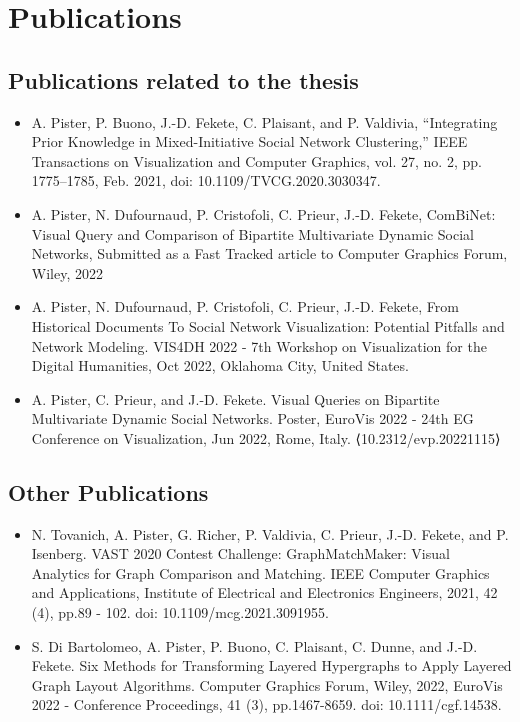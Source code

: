 \chapter*{Publications}


\section*{Publications related to the thesis}

\begin{itemize}
    \item A. Pister, P. Buono, J.-D. Fekete, C. Plaisant, and P. Valdivia, “Integrating Prior Knowledge in Mixed-Initiative Social Network Clustering,” IEEE Transactions on Visualization and Computer Graphics, vol. 27, no. 2, pp. 1775–1785, Feb. 2021, doi: 10.1109/TVCG.2020.3030347.
    \item A. Pister, N. Dufournaud, P. Cristofoli, C. Prieur, J.-D. Fekete, ComBiNet: Visual Query and Comparison of Bipartite Multivariate Dynamic Social Networks, Submitted as a Fast Tracked article to Computer Graphics Forum, Wiley, 2022
    \item A. Pister, N. Dufournaud, P. Cristofoli, C. Prieur, J.-D. Fekete, From Historical Documents To Social Network Visualization: Potential Pitfalls and Network Modeling. VIS4DH 2022 - 7th Workshop on Visualization for the Digital Humanities, Oct 2022, Oklahoma City, United States.
    \item  A. Pister, C. Prieur, and J.-D. Fekete. Visual Queries on Bipartite Multivariate Dynamic Social Networks. Poster, EuroVis 2022 - 24th EG Conference on Visualization, Jun 2022, Rome, Italy. ⟨10.2312/evp.20221115⟩
\end{itemize}


\section*{Other Publications}

\begin{itemize}
    \item N. Tovanich, A. Pister, G. Richer, P. Valdivia, C. Prieur, J.-D. Fekete, and P. Isenberg. VAST 2020 Contest Challenge: GraphMatchMaker: Visual Analytics for Graph Comparison and Matching. IEEE Computer Graphics and Applications, Institute of Electrical and Electronics Engineers, 2021, 42 (4), pp.89 - 102. doi: 10.1109/mcg.2021.3091955.
    \item S. Di Bartolomeo, A. Pister, P. Buono, C. Plaisant, C. Dunne, and J.-D. Fekete. Six Methods for Transforming Layered Hypergraphs to Apply Layered Graph Layout Algorithms. Computer Graphics Forum, Wiley, 2022, EuroVis 2022 - Conference Proceedings, 41 (3), pp.1467-8659. doi: 10.1111/cgf.14538.
\end{itemize}
